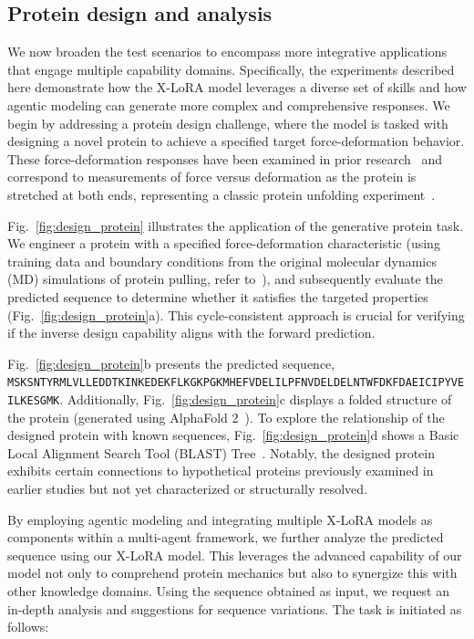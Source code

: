 \subsection{Protein design and analysis}

We now broaden the test scenarios to encompass more integrative applications that engage multiple capability domains. Specifically, the experiments described here demonstrate how the X-LoRA model leverages a diverse set of skills and how agentic modeling can generate more complex and comprehensive responses. We begin by addressing a protein design challenge, where the model is tasked with designing a novel protein to achieve a specified target force-deformation behavior. These force-deformation responses have been examined in prior research~\cite{Ni2023ForceGen:Model} and correspond to measurements of force versus deformation as the protein is stretched at both ends, representing a classic protein unfolding experiment~\cite{Lu1998UnfoldingSimulation.}.

Fig.~\ref{fig:design_protein} illustrates the application of the generative protein task. We engineer a protein with a specified force-deformation characteristic (using training data and boundary conditions from the original molecular dynamics (MD) simulations of protein pulling, refer to~\cite{Ni2023ForceGen:Model}), and subsequently evaluate the predicted sequence to determine whether it satisfies the targeted properties (Fig.~\ref{fig:design_protein}a). This cycle-consistent approach is crucial for verifying if the inverse design capability aligns with the forward prediction.

Fig.~\ref{fig:design_protein}b presents the predicted sequence, \texttt{MSKSNTYRMLVLLEDDTKINKEDEKFLKGKPGKMHEFVDELILPFNVDELDELNTWFDKFDAEICIPYVEILKESGMK}. Additionally, Fig.~\ref{fig:design_protein}c displays a folded structure of the protein (generated using AlphaFold 2~\cite{Jumper2021HighlyAlphaFoldb}). To explore the relationship of the designed protein with known sequences, Fig.~\ref{fig:design_protein}d shows a Basic Local Alignment Search Tool (BLAST) Tree~\cite{Altschul1990BasicTool}. Notably, the designed protein exhibits certain connections to hypothetical proteins previously examined in earlier studies but not yet characterized or structurally resolved.

By employing agentic modeling and integrating multiple X-LoRA models as components within a multi-agent framework, we further analyze the predicted sequence using our X-LoRA model. This leverages the advanced capability of our model not only to comprehend protein mechanics but also to synergize this with other knowledge domains. Using the sequence obtained as input, we request an in-depth analysis and suggestions for sequence variations. The task is initiated as follows:

